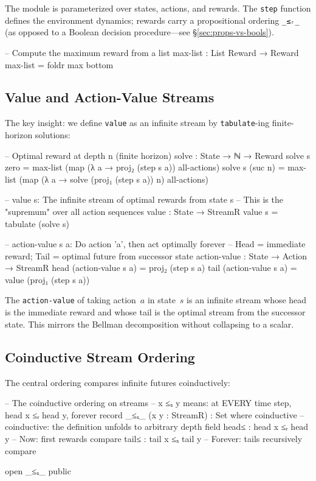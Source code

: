 \documentclass[9pt,a4paper]{article}
\theoremstyle{plain}
\theoremstyle{definition}
\theoremstyle{remark}
\begin{document}
\noindent The module is parameterized over states, actions, and rewards.  The \texttt{step} function defines the environment dynamics; rewards carry a propositional ordering \texttt{\_≤ᵣ\_} (as opposed to a Boolean decision procedure---see \S\ref{sec:props-vs-bools}).

\begin{code}
  -- Compute the maximum reward from a list
  max-list : List Reward → Reward
  max-list = foldr max bottom
\end{code}

\subsection{Value and Action-Value Streams}

The key insight: we define \texttt{value} as an infinite stream by \texttt{tabulate}-ing finite-horizon solutions:

\begin{code}
  -- Optimal reward at depth n (finite horizon)
  solve : State → ℕ → Reward
  solve s zero    = max-list (map (λ a → proj₂ (step s a)) all-actions)
  solve s (suc n) = max-list (map (λ a → solve (proj₁ (step s a)) n) all-actions)

  -- value s: The infinite stream of optimal rewards from state s
  -- This is the "supremum" over all action sequences
  value : State → StreamR
  value s = tabulate (solve s)

  -- action-value s a: Do action 'a', then act optimally forever
  -- Head = immediate reward; Tail = optimal future from successor state
  action-value : State → Action → StreamR
  head (action-value s a) = proj₂ (step s a)
  tail (action-value s a) = value (proj₁ (step s a))
\end{code}

\noindent The \texttt{action-value} of taking action~$a$ in state~$s$ is an infinite stream whose head is the immediate reward and whose tail is the optimal stream from the successor state.  This mirrors the Bellman decomposition without collapsing to a scalar.

\subsection{Coinductive Stream Ordering}

The central ordering compares infinite futures coinductively:

\begin{code}
  -- The coinductive ordering on streams
  -- x ≤ₛ y means: at EVERY time step, head x ≤ᵣ head y, forever
  record _≤ₛ_ (x y : StreamR) : Set where
    coinductive  -- coinductive: the definition unfolds to arbitrary depth
    field
      head≤ : head x ≤ᵣ head y   -- Now: first rewards compare
      tail≤ : tail x ≤ₛ tail y   -- Forever: tails recursively compare

  open _≤ₛ_ public
\end{code}
\end{document}

